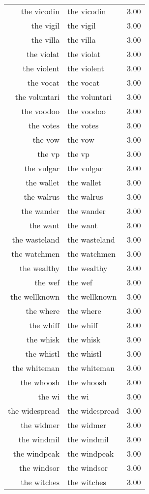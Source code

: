 \begin{table}[ht]
\begin{tabular}{rlr}
  the vicodin & the vicodin & 3.00 \\ 
  the vigil & the vigil & 3.00 \\ 
  the villa & the villa & 3.00 \\ 
  the violat & the violat & 3.00 \\ 
  the violent & the violent & 3.00 \\ 
  the vocat & the vocat & 3.00 \\ 
  the voluntari & the voluntari & 3.00 \\ 
  the voodoo & the voodoo & 3.00 \\ 
  the votes & the votes & 3.00 \\ 
  the vow & the vow & 3.00 \\ 
  the vp & the vp & 3.00 \\ 
  the vulgar & the vulgar & 3.00 \\ 
  the wallet & the wallet & 3.00 \\ 
  the walrus & the walrus & 3.00 \\ 
  the wander & the wander & 3.00 \\ 
  the want & the want & 3.00 \\ 
  the wasteland & the wasteland & 3.00 \\ 
  the watchmen & the watchmen & 3.00 \\ 
  the wealthy & the wealthy & 3.00 \\ 
  the wef & the wef & 3.00 \\ 
  the wellknown & the wellknown & 3.00 \\ 
  the where & the where & 3.00 \\ 
  the whiff & the whiff & 3.00 \\ 
  the whisk & the whisk & 3.00 \\ 
  the whistl & the whistl & 3.00 \\ 
  the whiteman & the whiteman & 3.00 \\ 
  the whoosh & the whoosh & 3.00 \\ 
  the wi & the wi & 3.00 \\ 
  the widespread & the widespread & 3.00 \\ 
  the widmer & the widmer & 3.00 \\ 
  the windmil & the windmil & 3.00 \\ 
  the windpeak & the windpeak & 3.00 \\ 
  the windsor & the windsor & 3.00 \\ 
  the witches & the witches & 3.00 \\ 

\end{tabular}
\end{table}
